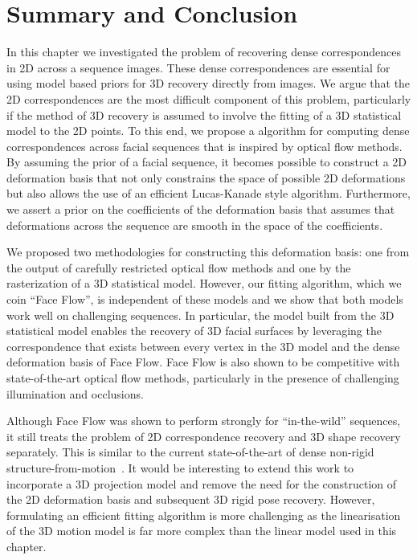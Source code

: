 \section{Summary and Conclusion}\label{sec:face_flow_conclusion}
In this chapter we investigated the problem of recovering dense correspondences
in 2D across a sequence images. These dense correspondences are essential
for using model based priors for 3D recovery directly from images. We argue that
the 2D correspondences are the most difficult component of this problem, 
particularly if the method of 3D recovery is assumed to involve the fitting
of a 3D statistical model to the 2D points. To this end, we propose a algorithm
for computing dense correspondences across facial sequences that is inspired by
optical flow methods. By assuming the prior of a facial sequence, it becomes
possible to construct a 2D deformation basis that not only constrains the space
of possible 2D deformations but also allows the use of an efficient Lucas-Kanade
style algorithm. Furthermore, we assert a prior on the coefficients
of the deformation basis that assumes that deformations across the sequence
are smooth in the space of the coefficients.

We proposed two methodologies for constructing this deformation basis: one
from the output of carefully restricted optical flow methods and one by
the rasterization of a 3D statistical model. However, our fitting algorithm,
which we coin ``Face Flow'', is independent of these models and we show that
both models work well on challenging sequences. In particular, the model built
from the 3D statistical model enables the recovery of 3D facial surfaces by 
leveraging the correspondence that exists between every vertex in the 3D model
and the dense deformation basis of Face Flow. Face Flow is also shown to be
competitive with state-of-the-art optical flow methods, particularly in
the presence of challenging illumination and occlusions.

Although Face Flow was shown to perform strongly for ``in-the-wild'' sequences,
it still treats the problem of 2D correspondence recovery and 3D shape recovery
separately.  This is similar to the current state-of-the-art of dense non-rigid
structure-from-motion~\cite{garg2013dense}. It would be interesting to
extend this work to incorporate a 3D projection model and remove the need
for the construction of the 2D deformation basis and subsequent 3D rigid pose
recovery. However, formulating an efficient fitting algorithm is more challenging
as the linearisation of the 3D motion model is far more complex than the linear
model used in this chapter.